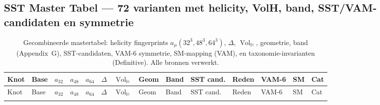 
\newcommand{\VolH}{\operatorname{Vol}_{\!\mathbb{H}}}
\subsection*{SST Master Tabel — 72 varianten met helicity, VolH, band, SST/VAM-candidaten en symmetrie}
\begin{landscape}
\scriptsize
\setlength{\tabcolsep}{3pt}
\begin{longtable}{@{}llrrrrrllp{3.2cm}lp{2.8cm}@{}}
\caption{Gecombineerde mastertabel: helicity fingerprints $a_\mu(32^3,48^3,64^3)$, $\Delta$, $\VolH$, geometrie, band (Appendix~G), SST-candidaten, VAM-6 symmetrie, SM-mapping (VAM), en taxonomie-invarianten (Definitive). Alle bronnen verwerkt.}\\
\toprule
Knot & Base & $a_{32}$ & $a_{48}$ & $a_{64}$ & $\Delta$ & $\VolH$ & Geom & Band & SST cand. & Reden & VAM-6 & SM & Cat \\
\midrule
\endfirsthead

\toprule
Knot & Base & $a_{32}$ & $a_{48}$ & $a_{64}$ & $\Delta$ & $\VolH$ & Geom & Band & SST cand. & Reden & VAM-6 & SM & Cat \\
\midrule
\endhead

\bottomrule
\endfoot


\end{longtable}
\end{landscape}
